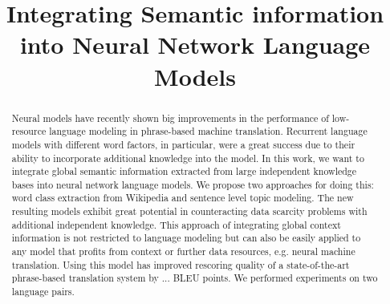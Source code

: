 \documentclass[a4paper]{article}
\title{Integrating Semantic information into Neural Network Language Models}
\begin{document}
\maketitle
%
\begin{abstract}
Neural models have recently shown big improvements in the performance of low-resource language modeling in phrase-based machine translation. Recurrent language models with different word factors, in particular, were a great success due to their ability to incorporate additional knowledge into the model. In this work, we want to integrate global semantic information extracted from large independent knowledge bases into neural network language models. We propose two approaches for doing this: word class extraction from Wikipedia and sentence level topic modeling. 
The new resulting models exhibit great potential in counteracting data scarcity problems with additional independent knowledge. This approach of integrating global context information is not restricted to language modeling but can also be easily applied to any model that profits from context or further data resources, e.g. neural machine translation. Using this model has improved rescoring quality of a state-of-the-art phrase-based translation system by ... BLEU points.  We performed experiments on two language pairs.



\end{abstract}


%
\end{document}
